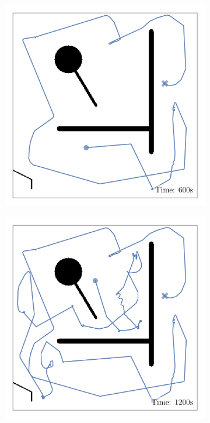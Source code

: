 \def\w{0.329\textwidth}
\begin{figure}[H]
    \centering
    \begin{subfigure}[b]{\w}
        \centering
        \includegraphics[width=\textwidth]{./figures/rl/small-agent-(after-600s).png}
    \end{subfigure}
    \begin{subfigure}[b]{\w}
        \centering
        \includegraphics[width=\textwidth]{./figures/rl/small-agent-(after-1200s).png}

\end{subfigure}
\end{figure}
